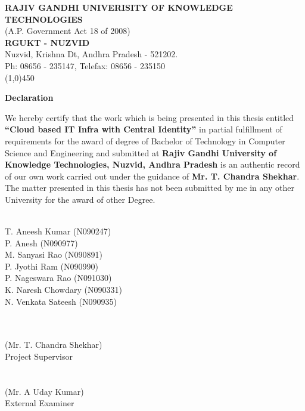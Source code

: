 \documentclass[12pt]{report}
\begin{document}
\thispagestyle{empty}
\begin{center}
  \textbf{RAJIV GANDHI UNIVERISITY OF KNOWLEDGE TECHNOLOGIES}  \\
 	(A.P. Government Act 18 of 2008) \\
 	\textbf{RGUKT - NUZVID} \\
 	Nuzvid, Krishna Dt, Andhra Pradesh - 521202. \\
 	Ph: 08656 - 235147, Telefax: 08656 - 235150 \\
 	\line(1,0){450}
\end{center}


\Large
\begin{center}
\textbf{Declaration}
\end{center}
\normalsize
\hspace{0.5cm} {We hereby certify that the work which is being presented in this thesis entitled \textbf{``Cloud based IT Infra with Central Identity''} in partial fulfillment of requirements for the award of degree of Bachelor of Technology in Computer Science and Engineering and submitted at \textbf{Rajiv Gandhi University of Knowledge Technologies, Nuzvid, Andhra Pradesh} is an authentic record of our own work carried out under the guidance  of \textbf{Mr. T. Chandra Shekhar}. The matter presented in this thesis has not been submitted by me in any other University for the award of other Degree.}


\begin{multicols}{2}
\begin{flushleft}
\underline{} \\
T. Aneesh Kumar (N090247) \\
P. Anesh (N090977) \\
M. Sanyasi Rao (N090891) \\
P. Jyothi Ram (N090990) \\
P. Nageswara Rao (N091030) \\
K. Naresh Chowdary (N090331) \\
N. Venkata Sateesh (N090935) \\
\end{flushleft}

\begin{flushright}
\underline{}\\
\vfill
\underline{\hspace{6cm}} \\
(Mr. T. Chandra Shekhar) \\
 Project Supervisor \\
 \vfill
 \underline{} \\
\underline{\hspace{6cm}} \\ 
(Mr. A Uday Kumar)  \\
 External Examiner \\ 
\end{flushright}
\end{multicols}
\end{document}
